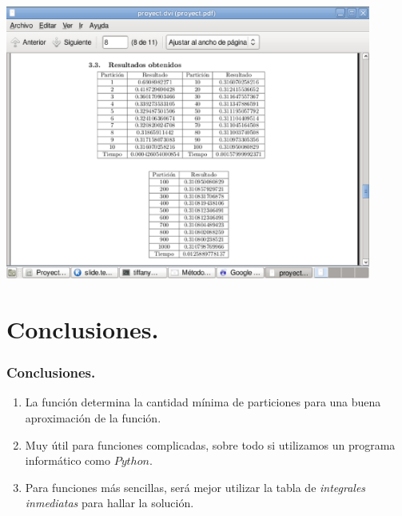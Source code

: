 \documentclass{beamer}
\begin{document}
  \begin{frame}
    \begin{center}
      \includegraphics[width=0.9\textwidth]{img1.eps}
    \end{center}
  \end{frame}
  \section{Conclusiones.}
  \begin{frame}
    \frametitle{Conclusiones.}
    \begin{enumerate}
      \item 
      La función determina la cantidad mínima de particiones para una buena aproximación de la función. \pause
      \item
      Muy útil para funciones complicadas, sobre todo si utilizamos un programa informático como $Python$. \pause
      \item
      Para funciones más sencillas, será mejor utilizar la tabla de \textit{integrales inmediatas} para hallar la solución.
    \end{enumerate}
  \end{frame}
\end{document}
